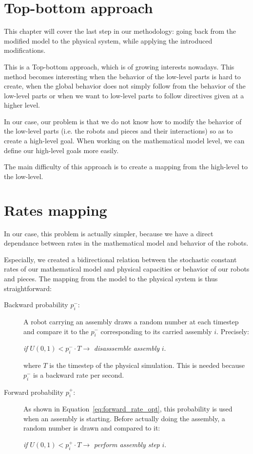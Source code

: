 \section{Top-bottom approach} %
\label{sec:top_bottom_approach}
	This chapter will cover the last step in our methodology: going back from the modified model to the physical system, while applying the introduced modifications.

	This is a Top-bottom approach, which is of growing interests nowadays. This method becomes interesting when the behavior of the low-level parts is hard to create, when the global behavior does not simply follow from the behavior of the low-level parts or when we want to low-level parts to follow directives given at a higher level.

	In our case, our problem is that we do not know how to modify the behavior of the low-level parts (i.e. the robots and pieces and their interactions) so as to create a high-level goal. When working on the mathematical model level, we can define our high-level goals more easily.

	The main difficulty of this approach is to create a mapping from the high-level to the low-level.

\section{Rates mapping} %
\label{sec:rates_mapping}
	In our case, this problem is actually simpler, because we have a direct dependance between rates in the mathematical model and behavior of the robots.
	
	Especially, we created a bidirectional relation between the stochastic constant rates of our mathematical model and physical capacities or behavior of our robots and pieces. The mapping from the model to the physical system is thus straightforward:
	\begin{description}
		\item[Backward probability $p_i^-$:] A robot carrying an assembly draws a random number at each timestep and compare it to the $p_i^-$ corresponding to its carried assembly $i$. Precisely:
		
		\textit{if} $U(0,1) < p_i^-\cdot T \rightarrow $ \textit{disasssemble assembly} $i$.
		
		where $T$ is the timestep of the physical simulation. This is needed because $p_i^-$ is a backward rate per second.
		\item[Forward probability $p_i^+$:] As shown in Equation~\eqref{eq:forward_rate_opt}, this probability is used when an assembly is starting. Before actually doing the assembly, a random number is drawn and compared to it:
		
		\textit{if} $U(0,1) < p_i^+\cdot T \rightarrow $ \textit{perform assembly step} $i$.
	\end{description}
	
